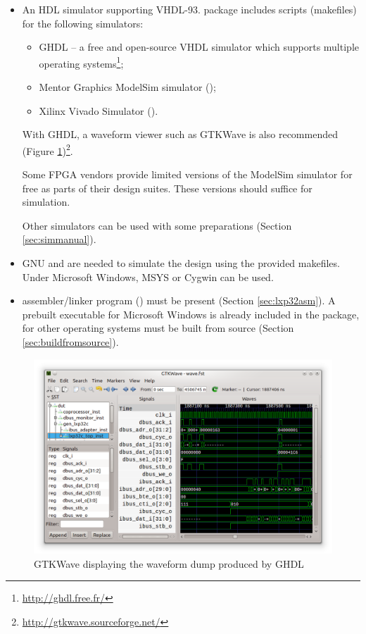 \documentclass[a4paper,12pt,twoside,extrafontsizes]{memoir}
\begin{document}
\begin{itemize}
	\item An HDL simulator supporting VHDL-93. \lxp{} package includes scripts (makefiles) for the following simulators:
	
	\begin{itemize}
		\item GHDL -- a free and open-source VHDL simulator which supports multiple operating systems\footnote{\url{http://ghdl.free.fr/}};
		\item Mentor Graphics\textregistered{} ModelSim\textregistered{} simulator ();
		\item Xilinx\textregistered{} Vivado\textregistered{} Simulator ().
	\end{itemize}
	
	With GHDL, a waveform viewer such as GTKWave is also recommended (Figure \ref{fig:gtkwave})\footnote{\url{http://gtkwave.sourceforge.net/}}.
	
	Some FPGA vendors provide limited versions of the ModelSim\textregistered{} simulator for free as parts of their design suites. These versions should suffice for \lxp{} simulation.
	
	Other simulators can be used with some preparations (Section \ref{sec:simmanual}).
	
	\item GNU  and  are needed to simulate the design using the provided makefiles. Under Microsoft\textregistered{} Windows\textregistered{}, MSYS or Cygwin can be used.
	\item \lxp{} assembler/linker program () must be present (Section \ref{sec:lxp32asm}). A prebuilt executable for Microsoft\textregistered{} Windows\textregistered{} is already included in the \lxp{} package, for other operating systems  must be built from source (Section \ref{sec:buildfromsource}).
\end{itemize}

\begin{figure}[htbp]
	\centering
	\includegraphics[scale=0.65]{images/gtkwave.png}
	\caption{GTKWave displaying the \lxp{} waveform dump produced by GHDL}
	\label{fig:gtkwave}
\end{figure}
\end{document}
